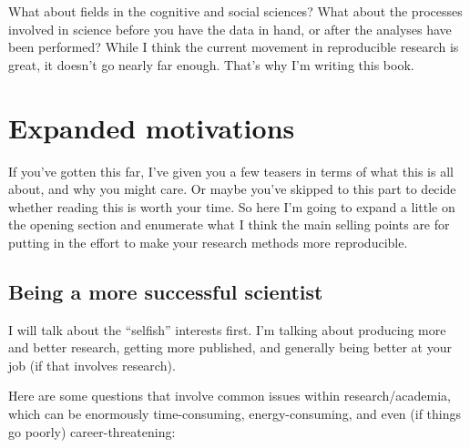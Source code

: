\documentclass{book}
\begin{document}
What about fields in the cognitive and social sciences?  What about the processes involved in science before you have the data in hand, or after the analyses have been performed?  While I think the current movement in reproducible research is great, it doesn't go nearly far enough. That's why I'm writing this book.
\section{Expanded motivations}
\label{sec-2-3}
\label{expandedmotivations}

If you've gotten this far, I've given you a few teasers in terms of what this is all about, and why you might care.  Or maybe you've skipped to this part to decide whether reading this is worth your time.  So here I'm going to expand a little on the opening section and enumerate what I think the main selling points are for putting in the effort to make your research methods more reproducible.
\subsection{Being a more successful scientist}
\label{sec-2-3-1}
\label{success}

I will talk about the ``selfish'' interests first. I'm talking about producing more and better research, getting more published, and generally being better at your job (if that involves research).

Here are some questions that involve common issues within research/academia, which can be enormously time-consuming, energy-consuming, and even (if things go poorly) career-threatening:
\end{document}
